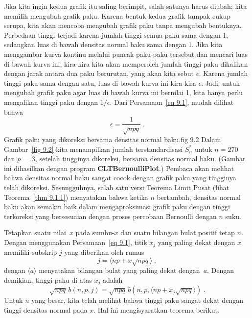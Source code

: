 \par
Jika kita ingin kedua grafik itu saling berimpit, salah satunya harus diubah; kita memilih mengubah
grafik paku.   Karena bentuk kedua grafik tampak cukup serupa, kita akan mencoba mengubah
grafik paku tanpa mengubah bentuknya.  Perbedaan tinggi terjadi karena jumlah
tinggi semua paku sama dengan 1, sedangkan luas di bawah densitas normal baku sama dengan 1. 
Jika kita menggambar kurva kontinu melalui puncak paku-paku tersebut dan mencari luas di bawah
kurva ini, kira-kira kita akan memperoleh jumlah tinggi paku dikalikan
dengan jarak antara dua paku berurutan, yang akan kita sebut $\epsilon$.  Karena jumlah
tinggi paku sama dengan satu, luas di bawah kurva ini kira-kira $\epsilon$. 
Jadi, untuk mengubah grafik paku agar luas di bawah kurva ini bernilai 1, kita hanya perlu
mengalikan tinggi paku dengan $1/\epsilon$.  Dari Persamaan~\ref{eq 9.1}, mudah dilihat
bahwa 
$$\epsilon = \frac {1}{\sqrt {npq}}\ .$$ 
{Grafik paku yang dikoreksi bersama densitas normal baku.}{fig 9.2} 
Dalam Gambar~\ref{fig 9.2} kita menampilkan jumlah terstandardisasi $S^*_n$ untuk $n = 270$ dan $p = .3$, 
setelah tingginya dikoreksi, bersama densitas normal baku.  (Gambar ini
dihasilkan dengan program {\bf CLTBernoulliPlot}.)  Pembaca
akan melihat bahwa densitas normal baku sangat cocok dengan grafik paku yang tingginya telah dikoreksi. 
Sesungguhnya, salah satu versi Teorema Limit Pusat (lihat Teorema~\ref{thm 9.1.1}) menyatakan bahwa ketika $n$
bertambah, densitas normal baku akan semakin baik dalam mengaproksimasi
grafik paku dengan tinggi terkoreksi yang bersesuaian dengan proses percobaan Bernoulli dengan $n$ suku. 
\par
Tetapkan suatu nilai~$x$ pada sumbu-$x$ dan suatu bilangan bulat positif tetap $n$.  Dengan menggunakan
Persamaan~\ref{eq 9.1}, titik $x_j$ yang paling dekat dengan $x$ memiliki subskrip $j$ yang diberikan oleh
rumus
$$
j = \langle np + x \sqrt{npq} \rangle\ ,
$$
dengan $\langle a \rangle$ menyatakan bilangan bulat yang paling dekat dengan~$a$.  
Dengan demikian, tinggi
paku di atas $x_j$ adalah
$$
\sqrt{npq}\,b(n,p,j) = \sqrt{npq}\,b(n,p,\langle np + x_j \sqrt{npq}
\rangle)\ .
$$
Untuk $n$ yang besar, kita telah melihat bahwa tinggi paku sangat dekat dengan tinggi
densitas normal pada $x$.  Hal ini mengisyaratkan teorema berikut.

